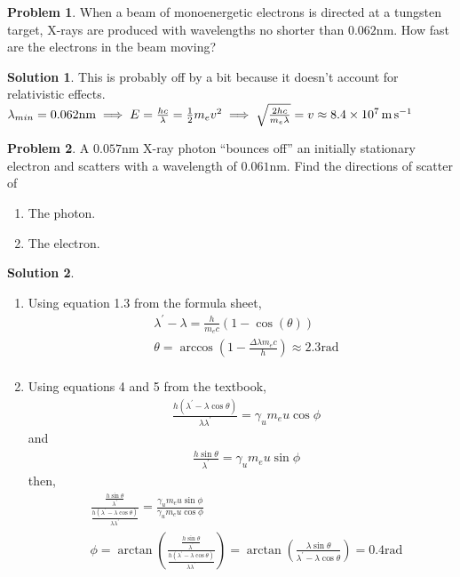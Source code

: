 \documentclass[10pt]{article}
\theoremstyle{definition}
\newtheorem{problem}{Problem}
\newtheorem{soln}{Solution}
\begin{document}
\begin{problem}
When a beam of monoenergetic electrons is directed at a tungsten target, X-rays are produced with wavelengths no shorter than
$0.062\unit{\nano\meter}$. How fast are the electrons in the beam moving?
\end{problem}
\begin{soln} This is probably off by a bit because it doesn't account for relativistic effects.
  $\lambda_{min}=0.062\unit{\nano\meter}\implies E=\frac{hc}{\lambda}=\frac{1}{2}m_ev^2\implies\sqrt{\frac{2hc}{m_e\lambda}}=v\approx\qty{8.4d7}{\meter\per\second}$
\end{soln}

\begin{problem}
A $0.057\unit{\nano\meter}$ X-ray photon ``bounces off'' an initially stationary electron and scatters with a wavelength of $0.061\unit{\nano\meter}$. Find the directions of scatter of
\begin{enumerate}[label=(\alph*)]
  \item The photon.
  \item The electron.
\end{enumerate}
\end{problem}
\begin{soln}~
  \begin{enumerate}[label=(\alph*)]
    \item Using equation 1.3 from the formula sheet,
          \begin{align*}
             & \lambda^\prime-\lambda=\frac{h}{m_ec}\left(1-\cos(\theta)\right)                   \\
             & \theta=\arccos\left(1-\frac{\Delta\lambda m_e c}{h}\right)\approx2.3\unit{\radian} \\
          \end{align*}
    \item Using equations 4 and 5 from the textbook,
          \begin{align*}
             & \frac{h\left(\lambda^\prime-\lambda\cos\theta\right)}{\lambda\lambda^\prime}=\gamma_um_eu\cos\phi
          \end{align*}
          and
          \begin{align*}
             & \frac{h\sin\theta}{\lambda^\prime}=\gamma_um_eu\sin\phi
          \end{align*}
          then,
          \begin{align*}
             & \frac{\frac{h\sin\theta}{\lambda^\prime}}{\frac{h\left(\lambda^\prime-\lambda\cos\theta\right)}{\lambda\lambda^\prime}}=\frac{\gamma_um_eu\sin\phi}{\gamma_um_eu\cos\phi}                                                                          \\
             & \phi=\arctan\left(\frac{\frac{h\sin\theta}{\lambda^\prime}}{\frac{h\left(\lambda^\prime-\lambda\cos\theta\right)}{\lambda\lambda^\prime}}\right)=\arctan\left(\frac{\lambda\sin\theta}{\lambda^\prime-\lambda\cos\theta} \right)=0.4\unit{\radian}
          \end{align*}
  \end{enumerate}
\end{soln}
\end{document}
